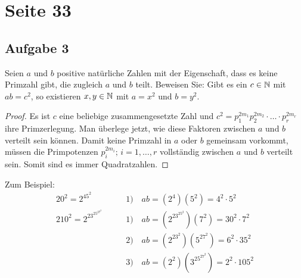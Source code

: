 \section{Seite 33}

\subsection{Aufgabe 3}
Seien $a$ und $b$ positive natürliche Zahlen mit der Eigenschaft, dass
es keine Primzahl gibt, die zugleich $a$ und $b$ teilt. Beweisen Sie:
Gibt es ein $c \in \mathbb{N}{}$ mit $ab = c^2$, so
existieren $x,y \in \mathbb{N}{}$ mit $a = x^2$ und $b = y^2$.
\begin{proof}
  Es ist $c$ eine beliebige zusammengesetzte Zahl und
  $c^2 = p_1^{2m_1}p_2^{2m_2} \cdot \ldots \cdot p_r^{2m_r}$
  ihre Primzerlegung. Man überlege jetzt,
  wie diese Faktoren zwischen $a$ und $b$ verteilt sein können.
  Damit keine Primzahl in $a$ oder $b$ gemeinsam vorkommt, müssen die
  Primpotenzen $p_i^{2m_i};\,i = 1,\dotsc,r$ vollständig zwischen
  $a$ und $b$ verteilt sein. Somit sind es immer Quadratzahlen.
\end{proof}
\noindent
Zum Beispiel:
\begin{align*}
  20^2 = 2^45^2 \qquad        & 1) \quad ab = (2^4)(5^2) = 4^2 \cdot 5^2         \\[8pt]
  210^2 = 2^23^25^27^2 \qquad & 1) \quad ab = (2^23^25^2)(7^2) = 30^2 \cdot 7^2  \\
                              & 2) \quad ab = (2^23^2)(5^27^2) = 6^2 \cdot 35^2  \\
                              & 3) \quad ab = (2^2)(3^25^27^2) = 2^2 \cdot 105^2
\end{align*}

\newpage
